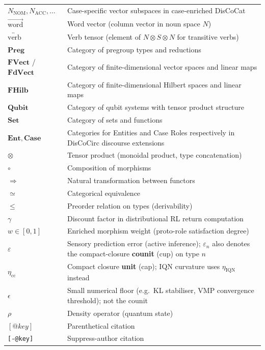 \documentclass[
]{article}
\begin{document}
\begin{longtable}[]{@{}
  >{\raggedright\arraybackslash}p{}
  >{\raggedright\arraybackslash}p{}@{}}
\(N_{\text{NOM}}, N_{\text{ACC}}, \ldots\) & Case-specific vector
subspaces in case-enriched DisCoCat \\
\(\overrightarrow{\text{word}}\) & Word vector (column vector in noun
space \(N\)) \\
\(\overleftrightarrow{\text{verb}}\) & Verb tensor (element of
\(N \otimes S \otimes N\) for transitive verbs) \\
\(\mathbf{Preg}\) & Category of pregroup types and reductions \\
\(\mathbf{FVect}\) / \(\mathbf{FdVect}\) & Category of
finite-dimensional vector spaces and linear maps \\
\(\mathbf{FHilb}\) & Category of finite-dimensional Hilbert spaces and
linear maps \\
\(\mathbf{Qubit}\) & Category of qubit systems with tensor product
structure \\
\(\mathbf{Set}\) & Category of sets and functions \\
\(\mathbf{Ent}, \mathbf{Case}\) & Categories for Entities and Case Roles
respectively in DisCoCirc discourse extensions \\
\(\otimes\) & Tensor product (monoidal product, type concatenation) \\
\(\circ\) & Composition of morphisms \\
\(\Rightarrow\) & Natural transformation between functors \\
\(\simeq\) & Categorical equivalence \\
\(\leq\) & Preorder relation on types (derivability) \\
\(\gamma{}\) & Discount factor in distributional RL return
computation \\
\(w \in [0,1]\) & Enriched morphism weight (proto-role satisfaction
degree) \\
\(\varepsilon\) & Sensory prediction error (active inference);
\(\varepsilon_n\) also denotes the compact-closure \textbf{counit} (cup)
on type \(n\) \\
\(\eta_{\mathrm{cc}}\) & Compact closure \textbf{unit} (cap); IQN
curvature uses \(\eta_{\mathrm{IQN}}\) instead \\
\(\epsilon\) & Small numerical floor (e.g.~KL stabiliser, VMP
convergence threshold); not the counit \\
\(\rho{}\) & Density operator (quantum state) \\
\([@key]\) & Parenthetical citation \\
\texttt{{[}-@key{]}} & Suppress-author citation \\

\end{longtable}
\end{document}
